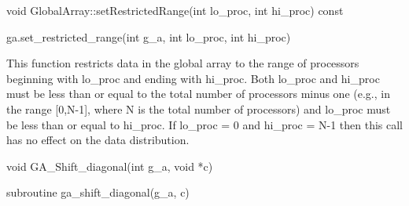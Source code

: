 \documentclass[12pt]{article}
\begin{document}
\begin{cxxapi}
\begin{cxxcode}
void GlobalArray::setRestrictedRange(int lo_proc, int hi_proc) const
\end{cxxcode}
\begin{funcargs}
\end{funcargs}
\end{cxxapi}

\begin{pyapi}
\begin{pycode}
ga.set_restricted_range(int g_a, int lo_proc, int hi_proc)
\end{pycode}
\begin{funcargs}
\end{funcargs}
\end{pyapi}

\gcoll

\begin{desc}

This function restricts data in the global array to the range of processors
beginning with lo_proc and ending with hi_proc. Both lo_proc and hi_proc must
be less than or equal to the total number of processors minus one (e.g., in the
range [0,N-1], where N is the total number of processors) and lo_proc must be
less than or equal to hi_proc. If lo_proc = 0 and hi_proc = N-1 then this call
has no effect on the data distribution.

\end{desc}



\begin{capi}
\begin{ccode}
void GA_Shift_diagonal(int g_a, void *c)
\end{ccode}
\begin{funcargs}
\end{funcargs}
\end{capi}

\begin{fapi}
\begin{fcode}
subroutine ga_shift_diagonal(g_a, c)
\end{fcode}
\begin{funcargs}
\end{funcargs}
\end{fapi}
\end{document}
